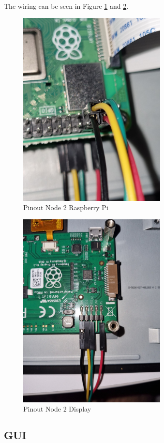 The wiring can be seen in Figure \ref{fig:node2-raspy} and \ref{fig:node2-display}.

\begin{figure}[h]
	\includegraphics[height=100mm]{images/node2-raspy.jpg}
	\centering
	\caption{Pinout Node 2 Raspberry Pi}
	\label{fig:node2-raspy}
\end{figure}

\begin{figure}[h]
	\includegraphics[height=100mm]{images/node2-display.jpg}
	\centering
	\caption{Pinout Node 2 Display}
	\label{fig:node2-display}
\end{figure}

\clearpage
\subsection{GUI}

